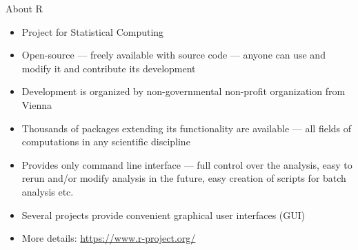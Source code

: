 \documentclass[compress, ucs, xelatex, 11pt, xcolor=svgnames, aspectratio=169,
	hyperref={
		bookmarks=true,
		unicode=true,
		colorlinks=true,
		pdftitle={Molecular data in R},
		plainpages=false,
		pdfauthor={Vojtech Zeisek},
		pdfsubject={Course about phylogeny and evolution in R},
		pdfcreator={XeLaTeX},
		pdfkeywords={R, evolution, phylogeny, molecular data},
		linkcolor=Crimson, %
		anchorcolor=Magenta, %
		citecolor=Magenta, %
		filecolor=Magenta, %
		menucolor=Magenta, %
		urlcolor=DodgerBlue, %
		pdftex},
	url={hyphens, lowtilde} %
	]{beamer}
\begin{document}
\begin{frame}{About R}
	\begin{itemize}
		\item Project for Statistical Computing
		\item Open-source --- freely available with source code --- anyone can use and modify it and contribute its development
		\item Development is organized by non-governmental non-profit organization from Vienna
		\item Thousands of packages extending its functionality are available --- all fields of computations in any scientific discipline
		\item Provides only command line interface --- full control over the analysis, easy to rerun and/or modify analysis in the future, easy creation of scripts for batch analysis etc.
		\item Several projects provide convenient graphical user interfaces (GUI)
		\item More details: \url{https://www.r-project.org/}
	\end{itemize}
\end{frame}
\end{document}
